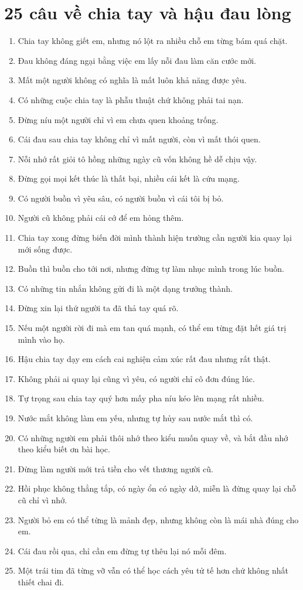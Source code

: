 \section{25 câu về chia tay và hậu đau lòng}
\begin{enumerate}[leftmargin=*,resume]
\item Chia tay không giết em, nhưng nó lột ra nhiều chỗ em từng bám quá chặt.
\item Đau không đáng ngại bằng việc em lấy nỗi đau làm căn cước mới.
\item Mất một người không có nghĩa là mất luôn khả năng được yêu.
\item Có những cuộc chia tay là phẫu thuật chứ không phải tai nạn.
\item Đừng níu một người chỉ vì em chưa quen khoảng trống.
\item Cái đau sau chia tay không chỉ vì mất người, còn vì mất thói quen.
\item Nỗi nhớ rất giỏi tô hồng những ngày cũ vốn không hề dễ chịu vậy.
\item Đừng gọi mọi kết thúc là thất bại, nhiều cái kết là cứu mạng.
\item Có người buồn vì yêu sâu, có người buồn vì cái tôi bị bỏ.
\item Người cũ không phải cái cớ để em hỏng thêm.
\item Chia tay xong đừng biến đời mình thành hiện trường cần người kia quay lại mới sống được.
\item Buồn thì buồn cho tới nơi, nhưng đừng tự làm nhục mình trong lúc buồn.
\item Có những tin nhắn không gửi đi là một dạng trưởng thành.
\item Đừng xin lại thứ người ta đã thả tay quá rõ.
\item Nếu một người rời đi mà em tan quá mạnh, có thể em từng đặt hết giá trị mình vào họ.
\item Hậu chia tay dạy em cách cai nghiện cảm xúc rất đau nhưng rất thật.
\item Không phải ai quay lại cũng vì yêu, có người chỉ cô đơn đúng lúc.
\item Tự trọng sau chia tay quý hơn mấy pha níu kéo lên mạng rất nhiều.
\item Nước mắt không làm em yếu, nhưng tự hủy sau nước mắt thì có.
\item Có những người em phải thôi nhớ theo kiểu muốn quay về, và bắt đầu nhớ theo kiểu biết ơn bài học.
\item Đừng làm người mới trả tiền cho vết thương người cũ.
\item Hồi phục không thẳng tắp, có ngày ổn có ngày dở, miễn là đừng quay lại chỗ cũ chỉ vì nhớ.
\item Người bỏ em có thể từng là mảnh đẹp, nhưng không còn là mái nhà đúng cho em.
\item Cái đau rồi qua, chỉ cần em đừng tự thêu lại nó mỗi đêm.
\item Một trái tim đã từng vỡ vẫn có thể học cách yêu tử tế hơn chứ không nhất thiết chai đi.
\end{enumerate}


